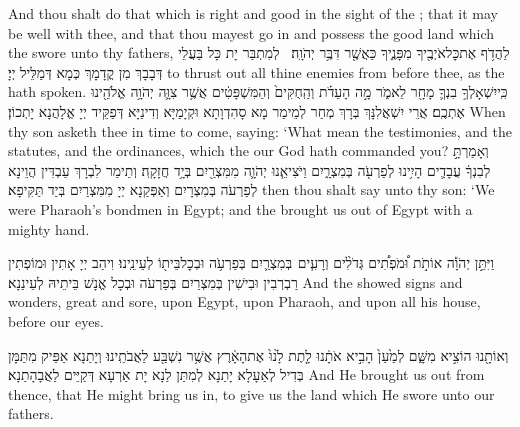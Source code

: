 {And thou shalt do that which is right and good in the sight of the \lord; that it may be well with thee, and that thou mayest go in and possess the good land which the \lord\space swore unto thy fathers,}{}
{לַהֲדֹ֥ף אֶת\maqqaf כׇּל\maqqaf אֹיְבֶ֖יךָ מִפָּנֶ֑יךָ כַּאֲשֶׁ֖ר דִּבֶּ֥ר יְהֹוָֽה׃ \setuma }
{לְמִתְבַּר יָת כָּל בַּעֲלֵי דְּבָבָךְ מִן קֳדָמָךְ כְּמָא דְּמַלֵּיל יְיָ׃}
{to thrust out all thine enemies from before thee, as the \lord\space hath spoken.}{}
{כִּֽי\maqqaf יִשְׁאָלְךָ֥ בִנְךָ֛ מָחָ֖ר לֵאמֹ֑ר מָ֣ה הָעֵדֹ֗ת וְהַֽחֻקִּים֙ וְהַמִּשְׁפָּטִ֔ים אֲשֶׁ֥ר צִוָּ֛ה יְהֹוָ֥ה אֱלֹהֵ֖ינוּ אֶתְכֶֽם׃}
{אֲרֵי יִשְׁאֲלִנָּךְ בְּרָךְ מְחַר לְמֵימַר מָא סָהִדְוָתָא וּקְיָמַיָּא וְדִינַיָּא דְּפַקֵּיד יְיָ אֱלָהֲנָא יָתְכוֹן׃}
{When thy son asketh thee in time to come, saying: ‘What mean the testimonies, and the statutes, and the ordinances, which the \lord\space our God hath commanded you?}{}
{וְאָמַרְתָּ֣ לְבִנְךָ֔ עֲבָדִ֛ים הָיִ֥ינוּ לְפַרְעֹ֖ה בְּמִצְרָ֑יִם וַיֹּצִיאֵ֧נוּ יְהֹוָ֛ה מִמִּצְרַ֖יִם בְּיָ֥ד חֲזָקָֽה׃}
{וְתֵימַר לִבְרָךְ עַבְדִּין הֲוֵינָא לְפַרְעֹה בְּמִצְרָיִם וְאַפְּקַנָא יְיָ מִמִּצְרַיִם בְּיַד תַּקִּיפָא׃}
{then thou shalt say unto thy son: ‘We were Pharaoh’s bondmen in Egypt; and the \lord\space brought us out of Egypt with a mighty hand.}{}

{וַיִּתֵּ֣ן יְהֹוָ֡ה אוֹתֹ֣ת וּ֠מֹפְתִ֠ים גְּדֹלִ֨ים וְרָעִ֧ים \pasek  בְּמִצְרַ֛יִם בְּפַרְעֹ֥ה וּבְכׇל\maqqaf בֵּית֖וֹ לְעֵינֵֽינוּ׃}
{וִיהַב יְיָ אָתִין וּמוֹפְתִין רַבְרְבִין וּבִישִׁין בְּמִצְרַיִם בְּפַרְעֹה וּבְכָל אֱנָשׁ בֵּיתֵיהּ לְעֵינַנָא׃}
{And the \lord\space showed signs and wonders, great and sore, upon Egypt, upon Pharaoh, and upon all his house, before our eyes.}{}

{וְאוֹתָ֖נוּ הוֹצִ֣יא מִשָּׁ֑ם לְמַ֙עַן֙ הָבִ֣יא אֹתָ֔נוּ לָ֤תֶת לָ֙נוּ֙ אֶת\maqqaf הָאָ֔רֶץ אֲשֶׁ֥ר נִשְׁבַּ֖ע לַאֲבֹתֵֽינוּ׃}
{וְיָתַנָא אַפֵּיק מִתַּמָּן בְּדִיל לְאַעָלָא יָתַנָא לְמִתַּן לַנָא יָת אַרְעָא דְּקַיֵּים לַאֲבָהָתַנָא׃}
{And He brought us out from thence, that He might bring us in, to give us the land which He swore unto our fathers.}{}

